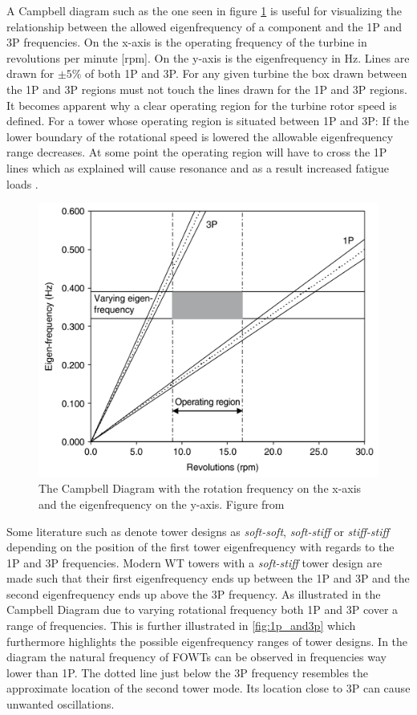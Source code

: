 A Campbell diagram such as the one seen in figure \cref{fig:campbell} is useful for visualizing the relationship between the allowed eigenfrequency of a component and the 1P and 3P frequencies. On the x-axis is the operating frequency of the turbine in revolutions per minute [rpm]. On the y-axis is the eigenfrequency in Hz. Lines are drawn for $ \pm 5 \% $ of both 1P and 3P. For any given turbine the box drawn between the 1P and 3P regions must not touch the lines drawn for the 1P and 3P regions. It becomes apparent why a clear operating region for the turbine rotor speed is defined. For a tower whose operating region is situated between 1P and 3P: If the lower boundary of the rotational speed is lowered the allowable eigenfrequency range decreases. At some point the operating region will have to cross the 1P lines which as explained will cause resonance and as a result increased fatigue loads \cite{Valentine2015}.
\begin{figure}[ht]
	\centering
	\includegraphics[width=0.5\linewidth]{Graphics/CampbellDiagram.PNG}
	\caption{The Campbell Diagram with the rotation frequency on the x-axis and the eigenfrequency on the y-axis. Figure from \cite{Valentine2015}}
	\label{fig:campbell}
\end{figure}
Some literature such as \cite{Dykes2018} denote tower designs as \textit{soft-soft}, \textit{soft-stiff} or \textit{stiff-stiff} depending on the position of the first tower eigenfrequency with regards to the 1P and 3P frequencies. Modern WT towers with a \textit{soft-stiff} tower design are made such that their first eigenfrequency ends up between the 1P and 3P and the second eigenfrequency ends up above the 3P frequency. As illustrated in the Campbell Diagram due to varying rotational frequency both 1P and 3P cover a range of frequencies. This is further illustrated in \cref{fig:1p_and3p} which furthermore highlights the possible eigenfrequency ranges of tower designs. In the diagram the natural frequency of FOWTs can be observed in frequencies way lower than 1P. The dotted line  just below the 3P frequency resembles the approximate location of the second tower mode. Its location close to 3P can cause unwanted oscillations.
